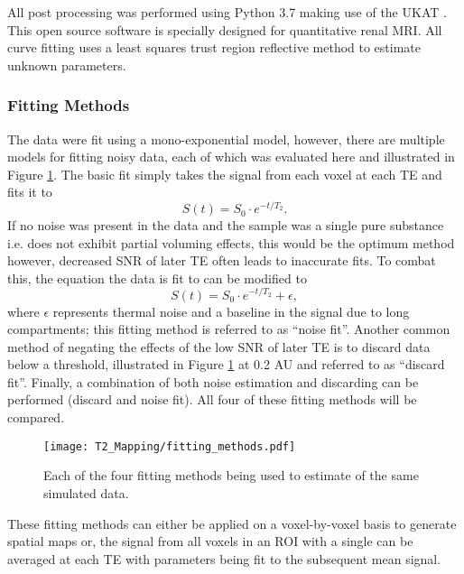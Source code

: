 All post processing was performed using Python 3.7 making use of the \ac{UKAT} \cite{nery_ukrin_2020}. This open source software is specially designed for quantitative renal \ac{MRI}. All curve fitting uses a least squares trust region reflective method to estimate unknown parameters.

\subsubsection{\ttwo Fitting Methods}

The data were fit using a mono-exponential model, however, there are multiple models for fitting noisy data, each of which was evaluated here and illustrated in Figure \ref{fig:t2_fitting_methods}. The basic fit simply takes the signal from each voxel at each \ac{TE} and fits it to 
\begin{equation}
	S(t) = S_0 \cdot e^{-t/T_2}.
	\label{eq:t2}
\end{equation}
If no noise was present in the data and the sample was a single pure substance i.e. does not exhibit partial voluming effects, this would be the optimum method however, decreased SNR of later \ac{TE} often leads to inaccurate fits. To combat this, the equation the data is fit to can be modified to
\begin{equation}
	S(t) = S_0 \cdot e^{-t/T_2} + \epsilon,
	\label{eq:t2_noise}
\end{equation}
where $\epsilon$ represents thermal noise and a baseline in the signal due to long \ttwo compartments; this fitting method is referred to as ``noise fit''. Another common method of negating the effects of the low \ac{SNR} of later \ac{TE} is to discard data below a threshold, illustrated in Figure \ref{fig:t2_fitting_methods} at 0.2 AU and referred to as ``discard fit''. Finally, a combination of both noise estimation and discarding can be performed (discard and noise fit). All four of these fitting methods will be compared.

\begin{figure}[H]
	\centering
	\texttt{[image: T2\_Mapping/fitting\_methods.pdf]}
	\caption{Each of the four fitting methods being used to estimate \ttwo of the same simulated data.}
	\label{fig:t2_fitting_methods}	
\end{figure}

These fitting methods can either be applied on a voxel-by-voxel basis to generate spatial maps or, the signal from all voxels in an \ac{ROI} with a single \ttwo can be averaged at each \ac{TE} with parameters being fit to the subsequent mean signal. 

